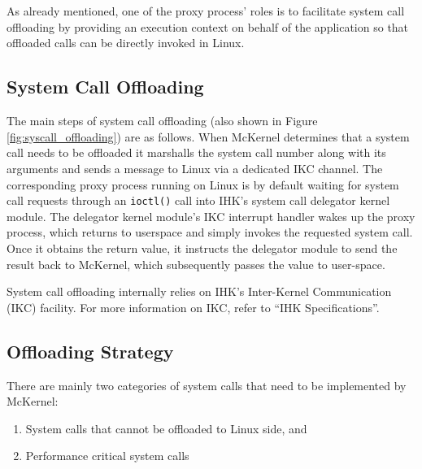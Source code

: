 \documentclass[twoside,11pt,fleqn]{book}
\begin{document}
\section{}\label{sec:syscall}
\label{sec:syscall_offloading}

As already mentioned, one of the proxy process' roles is to facilitate system
call offloading by providing an execution context on behalf of the application
so that offloaded calls can be directly invoked in Linux.

\subsection{System Call Offloading}

The main steps of system call offloading
(also shown in Figure \ref{fig:syscall_offloading}) are as follows.
When McKernel determines that a system call needs to be offloaded
it marshalls the system call number along with its arguments and
sends a message to Linux via a dedicated IKC channel.
The corresponding proxy process running on Linux is by default
waiting for system call requests through an \texttt{ioctl()}
call into IHK's system call delegator kernel module.
The delegator kernel module's IKC interrupt handler wakes up the proxy process,
which returns to userspace and simply invokes the requested system call.
Once it obtains the return value, it instructs the
delegator module to send the result back to McKernel, which subsequently
passes the value to user-space.

System call offloading internally relies on IHK's Inter-Kernel Communication
(IKC) facility. For more information on IKC, refer to ``IHK Specifications''.

\subsection{Offloading Strategy}
There are mainly two categories of system calls that need
to be implemented by McKernel:

\begin{enumerate}
\item System calls that cannot be offloaded to Linux side, and
\item Performance critical system calls
\end{enumerate}
\end{document}
